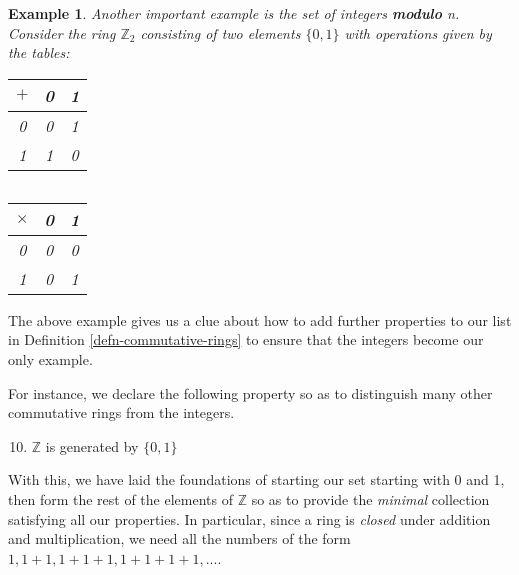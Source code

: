 \documentclass[11pt, oneside]{book}
\theoremstyle{break}
\newtheorem{eg}{Example}[section]
\newcommand{\bb}[1]{\mathbb{#1}}			%
\begin{document}
\begin{eg}
	Another important example is the set of integers \textbf{modulo} n. Consider the ring $\bb{Z}_2$ consisting of two elements $\{0, 1\}$ with operations given by the tables: \\
	\begin{center}
		\begin{tabular}{c|c c}
			$+$	&	0	&	1 \\
			\hline
			0	&	0	&	1 \\
			1	&	1	&	0
		\end{tabular}
		$\quad$
		\begin{tabular}{c|c c}
			$\times$	&	0	&	1 \\
			\hline
			0			&	0	&	0 \\
			1			&	0	&	1
		\end{tabular}
	\end{center}
\end{eg}

The above example gives us a clue about how to add further properties to our list in Definition \ref{defn-commutative-rings} to ensure that the integers become our only example.

For instance, we declare the following property so as to distinguish many other commutative rings from the integers.

\begin{enumerate}
	\setcounter{enumi}{9}
	\item $\bb{Z}$ is generated by $\{0, 1\}$
\end{enumerate}

With this, we have laid the foundations of starting our set starting with 0 and 1, then form the rest of the elements of $\bb{Z}$ so as to provide the \textit{minimal} collection satisfying all our properties. In particular, since a ring is \textit{closed} under addition and multiplication, we need all the numbers of the form $1, 1 + 1, 1 + 1 + 1, 1 + 1 + 1 + 1, ...$.
\end{document}
